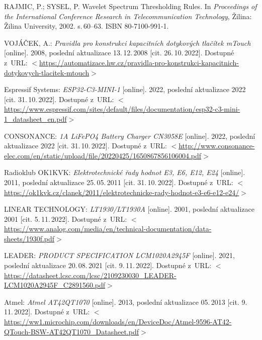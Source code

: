 \begin{thebibliography}{99}
    RAJMIC, P.; SYSEL, P.
    Wavelet Spectrum Thresholding Rules.
    In \emph{Proceedings of the International Conference Research in Telecommunication Technology},
    Žilina: Žilina University, 2002. s.\,60--63. ISBN 80-7100-991-1.

    VOJÁČEK, A.:
    \emph{Pravidla pro konstrukci kapacitních dotykových tlačítek mTouch}\/ [online].
    2008, poslední aktualizace 13.\,12.\,2008 [cit. 26.\,10.\,2022].
    Dostupné z~URL:
    \(<\)\url{https://automatizace.hw.cz/pravidla-pro-konstrukci-kapacitnich-dotykovych-tlacitek-mtouch}\(>\)

    Espressif Systems:
    \emph{ESP32-C3-MINI-1}\/ [online].
    2022, poslední aktualizace 2022 [cit. 31.\,10.\,2022].
    Dostupné z~URL:
    \(<\)\url{https://www.espressif.com/sites/default/files/documentation/esp32-c3-mini-1_datasheet_en.pdf}\(>\)

    CONSONANCE:
    \emph{1A LiFePO4 Battery Charger CN3058E}\/ [online].
    2022, poslední aktualizace 2022 [cit. 31.\,10.\,2022].
    Dostupné z~URL: %
    \(<\)\url{http://www.consonance-elec.com/en/static/upload/file/20220425/1650867856106004.pdf}\(>\)

    Radioklub OK1KVK:
    \emph{Elektrotechnické řady hodnot E3, E6, E12, E24}\/ [online].
    2011, poslední aktualizace 25.\,05.\,2011 [cit. 31.\,10.\,2022].
    Dostupné z~URL: 
    \(<\)\url{https://ok1kvk.cz/clanek/2011/elektrotechnicke-rady-hodnot-e3-e6-e12-e24/}\(>\)

    LINEAR TECHNOLOGY:
    \emph{LT1930/LT1930A}\/ [online].
    2001, poslední aktualizace 2001 [cit. 5.\,11.\,2022].
    Dostupné z~URL: 
    \(<\)\url{https://www.analog.com/media/en/technical-documentation/data-sheets/1930f.pdf}\(>\)

    LEADER:
    \emph{PRODUCT SPECIFICATION LCM1020A2945F}\/ [online].
    2021, poslední aktualizace 20.\,08.\,2021 [cit. 9.\,11.\,2022].
    Dostupné z~URL: 
    \(<\)\url{https://datasheet.lcsc.com/lcsc/2109230030_LEADER-LCM1020A2945F_C2891560.pdf}\(>\)

    Atmel:
    \emph{Atmel AT42QT1070}\/ [online].
    2013, poslední aktualizace 05.\,2013 [cit. 9.\,11.\,2022].
    Dostupné z~URL: 
    \(<\)\url{https://ww1.microchip.com/downloads/en/DeviceDoc/Atmel-9596-AT42-QTouch-BSW-AT42QT1070_Datasheet.pdf}\(>\)


\end{thebibliography}



